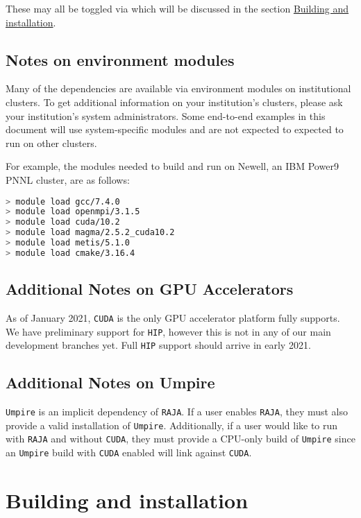 These may all be toggled via \cmake which will be discussed in the section \hyperref[sec:building_and_installation]{Building and installation}.

\subsection{Notes on environment modules}

Many of the dependencies are available via environment modules on institutional clusters.
To get additional information on your institution's clusters, please ask your institution's system administrators.
Some end-to-end examples in this document will use system-specific modules and are not expected to expected to run on other clusters.

For example, the modules needed to build and run \exago on Newell, an IBM Power9 PNNL cluster, are as follows:

\begin{lstlisting}[language=bash]
> module load gcc/7.4.0
> module load openmpi/3.1.5
> module load cuda/10.2
> module load magma/2.5.2_cuda10.2
> module load metis/5.1.0
> module load cmake/3.16.4
\end{lstlisting}

\subsection{Additional Notes on GPU Accelerators}

As of January 2021, \texttt{CUDA} is the only GPU accelerator platform \exago fully supports.
We have preliminary support for \texttt{HIP}, however this is not in any of our main development branches yet.
Full \texttt{HIP} support should arrive in early 2021.

\subsection{Additional Notes on Umpire}

\texttt{Umpire} is an implicit dependency of \texttt{RAJA}.
If a user enables \texttt{RAJA}, they must also provide a valid installation of \texttt{Umpire}.
Additionally, if a user would like to run \exago with \texttt{RAJA} and without \texttt{CUDA}, they must provide a CPU-only build of \texttt{Umpire} since an \texttt{Umpire} build with \texttt{CUDA} enabled will link against \texttt{CUDA}.

\section{Building and installation}
\label{sec:building_and_installation}

